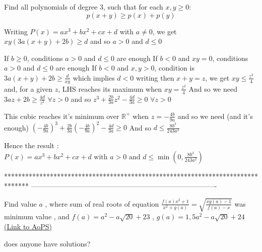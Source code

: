 \begin{solution}
	\begin{tcolorbox}Find all polynomials of degree 3, such that for each $x,y\geq 0$: \[p(x+y)\geq p(x)+p(y)\]\end{tcolorbox}
Writing $P(x)=ax^3+bx^2+cx+d$ with $a\ne 0$, we get $xy(3a(x+y)+2b)\ge d$ and so $a>0$ and $d\le 0$

If $b\ge 0$, conditions $a>0$ and $d\le 0$ are enough
If $b<0$ and $xy=0$, conditions $a>0$ and $d\le 0$ are enough
If $b<0$ and $x,y>0$, condition is $3a(x+y)+2b\ge \frac d{xy}$ which implies $d<0$
writing then $x+y=z$, we get $xy\le \frac {z^2}4$ and, for a given $z$, LHS reaches its maximum when $xy=\frac {z^2}4$
And so we need $3az+2b\ge \frac {4d}{z^2}$ $\forall z>0$ and so $z^3+\frac{2b}{3a}z^2-\frac{4d}{3a}\ge 0$ $\forall z>0$

This cubic reaches it's minimum over $\mathbb R^+$ when $z=-\frac{4b}{9a}$ and so we need (and it's enough) $\left(-\frac{4b}{9a}\right)^3+\frac{2b}{3a}\left(-\frac{4b}{9a}\right)^2-\frac{4d}{3a}\ge 0$
And so $d\le \frac{8b^3}{243 a^2}$

Hence the result : $\boxed{P(x)=ax^3+bx^2+cx+d\text{ with }a>0\text{ and }d\le\min\left(0, \frac{8b^3}{243 a^2}\right)}$
\end{solution}
*******************************************************************************
-------------------------------------------------------------------------------

\begin{problem}
	Find value $a$ , where sum of real roots of equation $\frac{f(a)x^2 +1}{x^2+g(a)}=\sqrt{\frac{xg(a)-1}{f(a)-x}}$ was minimum value , and $f(a)=a^2-a\sqrt{20} +23$ , $g(a)=1,5a^2-a\sqrt{20}+24$
	\flushright \href{https://artofproblemsolving.com/community/c6h618688}{(Link to AoPS)}
\end{problem}



\begin{solution}
	does anyone have solutions?
\end{solution}



